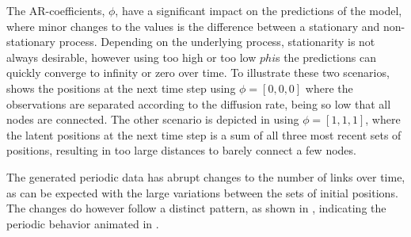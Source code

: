     The AR-coefficients, $\phi$, have a significant impact on the predictions of the model, where minor changes to the values is the difference between a stationary and non-stationary process. Depending on the underlying process, stationarity is not always desirable, however using too high or too low $phi$s the predictions can quickly converge to infinity or zero over time. 
    To illustrate these two scenarios,  shows the positions at the next time step using $\phi=[0,0,0]$ where the observations are separated according to the diffusion rate, being so low that all nodes are connected. 
    The other scenario is depicted in  using $\phi=[1,1,1]$, where the latent positions at the next time step is a sum of all three most recent sets of positions, resulting in too large distances to barely connect a few nodes.
    
    The generated periodic data has abrupt changes to the number of links over time, as can be expected with the large variations between the sets of initial positions. The changes do however follow a distinct pattern, as shown in , indicating the periodic behavior animated in .
